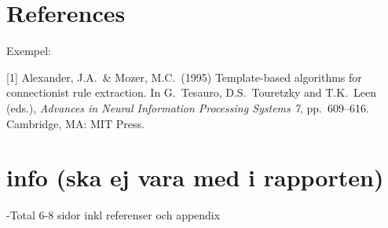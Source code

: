 \documentclass{article}
\begin{document}
\section*{References}

Exempel:
\medskip

\small

[1] Alexander, J.A.\ \& Mozer, M.C.\ (1995) Template-based algorithms for
connectionist rule extraction. In G.\ Tesauro, D.S.\ Touretzky and T.K.\ Leen
(eds.), {\it Advances in Neural Information Processing Systems 7},
pp.\ 609--616. Cambridge, MA: MIT Press.

\section{info (ska ej vara med i rapporten)}

-Total 6-8 sidor inkl referenser och appendix
\end{document}
